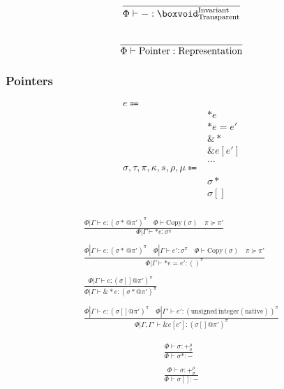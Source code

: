 \documentclass {article}
\begin{document}
\begin{gather*}
\frac
{}
{\Phi \vdash - : \boxvoid^\text{Invariant}_\text{Transparent}} \\
\\
\frac
{}
{\Phi \vdash \text{Pointer} : \text{Representation}} \\
\end{gather*}

\subsubsection{Pointers}
\begin{align*}
e \Coloneqq & \\
& *e \tag{Read Pointer} \\
& *e = e' \tag{Write Pointer} \\
& \& * \tag{Array to Pointer} \\
& \& e [e'] \tag{Array Increment} \\
& \dots \\
\sigma, \tau, \pi, \kappa, s, \rho, \mu \Coloneqq & \\
& \sigma* \tag{Pointer} \\
& \sigma[] \tag{Array Pointer} \\
\end{align*}

\begin{gather*}
\frac
{\Phi | \Gamma \vdash e : (\sigma* \, @ \pi')^\pi \quad \Phi \vdash \text{Copy} (\sigma) \quad \pi \succeq \pi'}
{\Phi | \Gamma \vdash * e  : \sigma^\pi} \\
\\
\frac
{\Phi | \Gamma \vdash e : (\sigma* \, @ \pi')^\pi \quad \Phi | \Gamma \vdash e' : \sigma^\pi  \quad \Phi \vdash \text{Copy} (\sigma) \quad \pi \succeq \pi'}
{\Phi | \Gamma \vdash *e  = e' : ()^\pi } \\
\\
\frac
{\Phi | \Gamma \vdash e : (\sigma[] @ \pi') ^ \pi}
{\Phi | \Gamma \vdash \& * e : (\sigma * @ \pi') ^ \pi}\\
\\
\frac
{\Phi | \Gamma \vdash e : (\sigma [] @ \pi')^\pi \quad \Phi |
 \Gamma' \vdash e' : (\text{unsigned} \, \text{integer}(\text{native}))^\pi}
{\Phi | \Gamma, \Gamma' \vdash \&e [e'] : (\sigma [] @  \pi')^\pi}
\end{gather*}

\begin{gather*}
\frac
{\Phi \vdash \sigma : +^{\rho}_\sigma}
{\Phi \vdash \sigma* : -} \\
\\
\frac
{\Phi \vdash \sigma : +^{\rho}_\sigma}
{\Phi \vdash \sigma [] : -} \\
\end{gather*}
\end{document}
